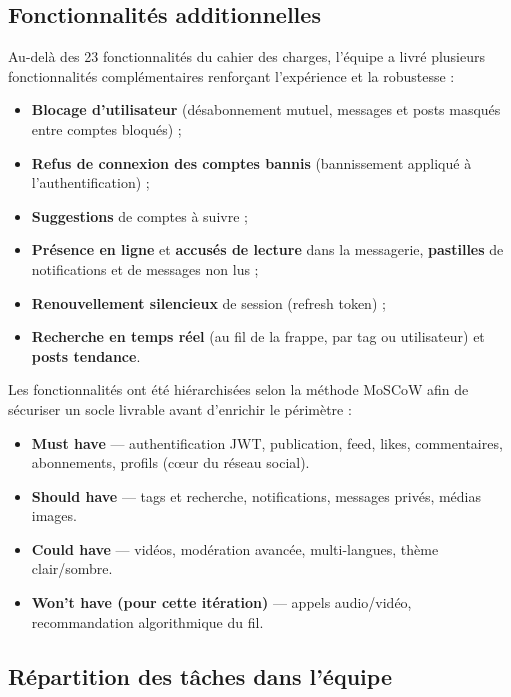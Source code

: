 \subsection{Fonctionnalités additionnelles}

Au-delà des 23 fonctionnalités du cahier des charges, l'équipe a livré plusieurs
fonctionnalités complémentaires renforçant l'expérience et la robustesse :

\begin{itemize}[leftmargin=1.4em]
  \item \textbf{Blocage d'utilisateur} (désabonnement mutuel, messages et posts
        masqués entre comptes bloqués) ;
  \item \textbf{Refus de connexion des comptes bannis} (bannissement appliqué à
        l'authentification) ;
  \item \textbf{Suggestions} de comptes à suivre ;
  \item \textbf{Présence en ligne} et \textbf{accusés de lecture} dans la
        messagerie, \textbf{pastilles} de notifications et de messages non lus ;
  \item \textbf{Renouvellement silencieux} de session (refresh token) ;
  \item \textbf{Recherche en temps réel} (au fil de la frappe, par tag ou
        utilisateur) et \textbf{posts tendance}.
\end{itemize}

\noindent Les fonctionnalités ont été hiérarchisées selon la méthode MoSCoW afin de
sécuriser un socle livrable avant d'enrichir le périmètre :

\begin{itemize}[leftmargin=1.4em]
  \item \textbf{Must have} — authentification JWT, publication, feed, likes,
        commentaires, abonnements, profils (cœur du réseau social).
  \item \textbf{Should have} — tags et recherche, notifications, messages privés,
        médias images.
  \item \textbf{Could have} — vidéos, modération avancée, multi-langues,
        thème clair/sombre.
  \item \textbf{Won't have (pour cette itération)} — appels audio/vidéo,
        recommandation algorithmique du fil.
\end{itemize}

\subsection{Répartition des tâches dans l'équipe}
\label{sec:repartition}

